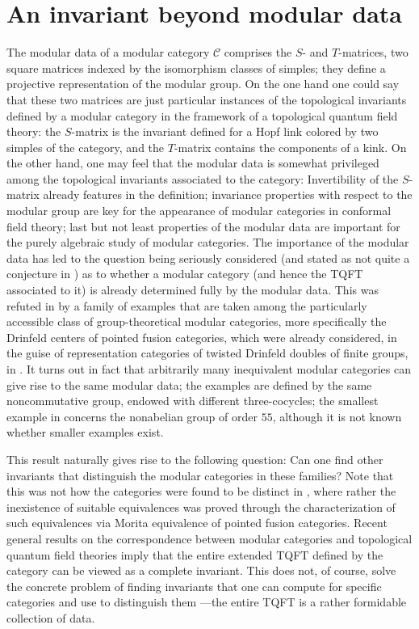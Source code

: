\documentclass[11pt]{book}
\theoremstyle{Rem}
\theoremstyle{definition}
\numberwithin{equation}{section}
\newcommand\C{\mathcal C}
\begin{document}
\chapter{An invariant beyond modular data}
The modular data of a modular category $\C$ comprises the $S$- and $T$-matrices, two square matrices indexed by the isomorphism classes of simples; they define a projective representation of the modular group. On the one hand one could say that these two matrices are just particular instances of the topological invariants defined by a modular category in the framework of a topological quantum field theory: the $S$-matrix is the invariant defined for a Hopf link colored by two simples of the category, and the $T$-matrix contains the components of a kink. On the other hand, one may feel that the modular data is somewhat privileged among the topological invariants associated to the category: Invertibility of the $S$-matrix already features in the definition; invariance properties with respect to the modular group are key for the appearance of modular categories in conformal field theory; last but not least properties of the modular data are important for the purely algebraic study of modular categories. The importance of the modular data has led to the question being seriously considered (and stated as not quite a conjecture in \cite{BNRW}) as to whether a modular category (and hence the TQFT associated to it) is already determined fully by the modular data. This was refuted in \cite{2017arXiv170802796M} by a family of examples that are taken among the particularly accessible class of group-theoretical modular categories, more specifically the Drinfeld centers of pointed fusion categories, which were already considered, in the guise of representation categories of twisted Drinfeld doubles of finite groups, in \cite{DijPasRoc:QHAGCOM}. It turns out in fact that arbitrarily many inequivalent modular categories can give rise to the same modular data; the examples are defined by the same noncommutative group, endowed with different three-cocycles; the smallest example in \cite{2017arXiv170802796M} concerns the nonabelian group of order $55$, although it is not known whether smaller examples exist.

This result naturally gives rise to the following question: Can one find other invariants that distinguish the modular categories in these families? Note that this was not how the categories were found to be distinct in \cite{2017arXiv170802796M}, where rather the inexistence of suitable equivalences was proved through the characterization of such equivalences via Morita equivalence of pointed fusion categories. Recent general results on the correspondence between modular categories and topological quantum field theories \cite{2015arXiv150906811B} imply that the entire extended TQFT defined by the category can be viewed as a complete invariant. This does not, of course, solve the concrete problem of finding invariants that one can compute for specific categories and use to distinguish them ---the entire TQFT is a rather formidable collection of data.
\end{document}
